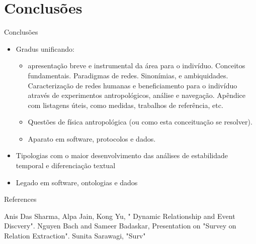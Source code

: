 \documentclass[10pt]{beamer}
\begin{document}
\section{Conclusões}
\begin{frame}{Conclusões}
\begin{itemize}
	\item Gradus unificando:
		\begin{itemize}
			\item  apresentação breve e instrumental da área para o indivíduo. Conceitos fundamentais. Paradigmas de redes. Sinonímias, e ambiquidades. Caracterização de redes humanas e beneficiamento para o indivíduo através de experimentos antropológicos, análise e navegação.
				Apêndice com listagens úteis, como medidas, trabalhos de referência, etc.
			\item Questões de física antropológica (ou como esta conceituação se resolver).
			\item Aparato em software, protocolos e dados.
		\end{itemize}
	\item Tipologias com o maior desenvolvimento das análises de estabilidade temporal e diferenciação textual
	\item Legado em software, ontologias e dados
\end{itemize}
\end{frame}

\begin{frame}{References}
  \begin{thebibliography}{99}
Anis Das Sharma, Alpa Jain, Kong Yu, " Dynamic Relationship and Event Discvery".
Nguyen Bach and Sameer Badaskar, Presentation on "Survey on Relation Extraction".
Sunita Sarawagi, "Surv"
\end{thebibliography}
\end{frame}

\begin{frame}
\Large
\begin{center}
\end{center}
\end{frame}
\end{document}
